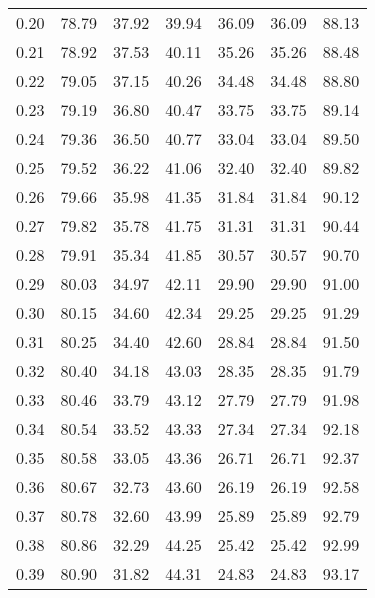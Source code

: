 \begin{tabular}{|c|c|c|c|c|c|c|}
      0.20 &     78.79 &     37.92 &      39.94 &   36.09 &      36.09 &         88.13 \\
      0.21 &     78.92 &     37.53 &      40.11 &   35.26 &      35.26 &         88.48 \\
      0.22 &     79.05 &     37.15 &      40.26 &   34.48 &      34.48 &         88.80 \\
      0.23 &     79.19 &     36.80 &      40.47 &   33.75 &      33.75 &         89.14 \\
      0.24 &     79.36 &     36.50 &      40.77 &   33.04 &      33.04 &         89.50 \\
      0.25 &     79.52 &     36.22 &      41.06 &   32.40 &      32.40 &         89.82 \\
      0.26 &     79.66 &     35.98 &      41.35 &   31.84 &      31.84 &         90.12 \\
      0.27 &     79.82 &     35.78 &      41.75 &   31.31 &      31.31 &         90.44 \\
      0.28 &     79.91 &     35.34 &      41.85 &   30.57 &      30.57 &         90.70 \\
      0.29 &     80.03 &     34.97 &      42.11 &   29.90 &      29.90 &         91.00 \\
      0.30 &     80.15 &     34.60 &      42.34 &   29.25 &      29.25 &         91.29 \\
      0.31 &     80.25 &     34.40 &      42.60 &   28.84 &      28.84 &         91.50 \\
      0.32 &     80.40 &     34.18 &      43.03 &   28.35 &      28.35 &         91.79 \\
      0.33 &     80.46 &     33.79 &      43.12 &   27.79 &      27.79 &         91.98 \\
      0.34 &     80.54 &     33.52 &      43.33 &   27.34 &      27.34 &         92.18 \\
      0.35 &     80.58 &     33.05 &      43.36 &   26.71 &      26.71 &         92.37 \\
      0.36 &     80.67 &     32.73 &      43.60 &   26.19 &      26.19 &         92.58 \\
      0.37 &     80.78 &     32.60 &      43.99 &   25.89 &      25.89 &         92.79 \\
      0.38 &     80.86 &     32.29 &      44.25 &   25.42 &      25.42 &         92.99 \\
      0.39 &     80.90 &     31.82 &      44.31 &   24.83 &      24.83 &         93.17 \\

\end{tabular}
